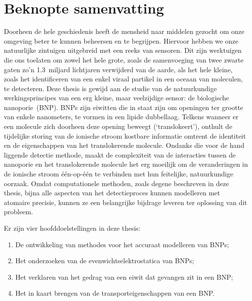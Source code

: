 \chapter{Beknopte samenvatting}
%
\label{ch:abstractnl}
%

Doorheen de hele geschiedenis heeft de mensheid naar middelen gezocht om onze omgeving beter te kunnen
beheersen en te begrijpen. Hiervoor hebben we onze natuurlijke zintuigen uitgebreid met een reeks van
sensoren. Dit zijn werktuigen die ons toelaten om zowel het hele grote, zoals de samenvoeging van twee zwarte
gaten zo'n \num{1.3}~miljard lichtjaren verwijderd van de aarde, als het hele kleine, zoals het identificeren
van een enkel viraal partikel in een oceaan van moleculen, te detecteren. Deze thesis is gewijd aan de studie
van de natuurkundige werkingsprincipes van een erg kleine, maar veelzijdige sensor: de biologische
nanoporie~(BNP). BNPs zijn eiwitten die in staat zijn om openingen ter grootte van enkele nanometers, te
vormen in een lipide dubbellaag. Telkens wanneer er een molecule zich doorheen deze opening beweegt
(`translokeert'), onthult de tijdelijke storing van de ionische stroom kostbare informatie omtrent de
identiteit en de eigenschappen van het translokerende molecule. Ondanks die voor de hand liggende detectie
methode, maakt de complexiteit van de interacties tussen de nanoporie en het translokerende molecule het erg
moeilijk om de veranderingen in de ionische stroom \'{e}\'{e}n-op-\'{e}\'{e}n te verbinden met hun feitelijke,
natuurkundige oorzaak. Omdat computationele methoden, zoals degene beschreven in deze thesis, bijna alle
aspecten van het detectieproces kunnen modelleren met atomaire precisie, kunnen ze een belangrijke bijdrage
leveren ter oplossing van dit probleem.

Er zijn vier hoofddoelstellingen in deze thesis:
%
\begin{enumerate}
  \item De ontwikkeling van methodes voor het accuraat modelleren van BNPs;
  \item Het onderzoeken van de evenwichtselektrostatica van BNPs;  
  \item Het verklaren van het gedrag van een eiwit dat gevangen zit in een BNP;
  \item Het in kaart brengen van de transporteigenschappen van een BNP.
\end{enumerate}
%

